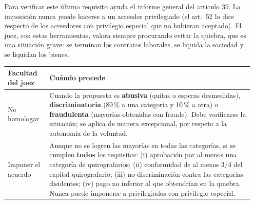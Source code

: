 \documentclass[12pt,oneside]{book}
\begin{document}
Para verificar este último requisito ayuda el informe general del artículo 39. La imposición nunca puede hacerse a un acreedor privilegiado (el art.\ 52 lo dice respecto de los acreedores con privilegio especial que no hubieran aceptado). El juez, con estas herramientas, valora siempre procurando evitar la quiebra, que es una situación grave: se terminan los contratos laborales, se liquida la sociedad y se liquidan los bienes.

\begin{center}
\small
\begin{tabularx}{\textwidth}{P{3cm} Y}
\toprule
\textbf{Facultad del juez} & \textbf{Cuándo procede} \\
\midrule
No homologar & Cuando la propuesta es \textbf{abusiva} (quitas o esperas desmedidas), \textbf{discriminatoria} (80\,\% a una categoría y 10\,\% a otra) o \textbf{fraudulenta} (mayorías obtenidas con fraude). Debe verificarse la situación; se aplica de manera excepcional, por respeto a la autonomía de la voluntad. \\
Imponer el acuerdo & Aunque no se logren las mayorías en todas las categorías, si se cumplen \textbf{todos} los requisitos: (i) aprobación por al menos una categoría de quirografarios; (ii) conformidad de al menos 3/4 del capital quirografario; (iii) no discriminación contra las categorías disidentes; (iv) pago no inferior al que obtendrían en la quiebra. Nunca puede imponerse a privilegiados con privilegio especial. \\
\bottomrule
\end{tabularx}
\end{center}
\end{document}
